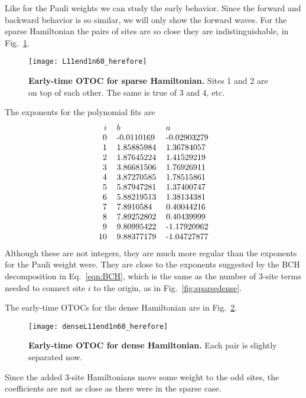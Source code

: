 Like for the Pauli weights we can study the early behavior. Since the forward and backward behavior is so similar, we will only show the forward waves. For the sparse Hamiltonian the pairs of sites are so close they are indistinguishable, in Fig.~\ref{fig:L11end1n60_herefore}.
\begin{figure}
	\centering
	\texttt{[image: L11end1n60\_herefore]}
	\caption{\textbf{Early-time OTOC for sparse Hamiltonian.} Sites 1 and 2 are on top of each other. The same is true of 3 and 4, etc.}
	\label{fig:L11end1n60_herefore}
\end{figure}
The exponents for the polynomial fits are
\begin{align*}
\begin{tabular}{rll}
$i$ & $b$ & $a$\\
0 &-0.0110169 & -0.02903279\\
1 & 1.85885984 & 1.36784057\\
2 & 1.87645224 & 1.41529219\\
3 & 3.86681506 & 1.76926911\\
4 & 3.87270585 & 1.78515861\\
5 & 5.87947281 & 1.37400747\\
6 & 5.88219513 & 1.38134381\\
7 & 7.8910584  & 0.40044216\\
8 & 7.89252802 & 0.40439999\\
9 & 9.80995422 &-1.17920962\\
10& 9.88377179 &-1.04727877
\end{tabular}
\end{align*}
Although these are not integers, they are much more regular than the exponents for the Pauli weight were. They are close to the exponents suggested by the BCH decomposition in Eq.~\ref{eqn:BCH}, which is the same as the number of 3-site terms needed to connect site $i$ to the origin, as in Fig.~\ref{fig:sparsedense}.

The early-time OTOCs for the dense Hamiltonian are in Fig.~\ref{fig:denseL11end1n60_herefore}.
\begin{figure}
	\centering
	\texttt{[image: denseL11end1n60\_herefore]}
	\caption{\textbf{Early-time OTOC for dense Hamiltonian.} Each pair is slightly separated now.}
	\label{fig:denseL11end1n60_herefore}
\end{figure}
Since the added 3-site Hamiltonians move some weight to the odd sites, the coefficients are not as close as there were in the sparse case.

